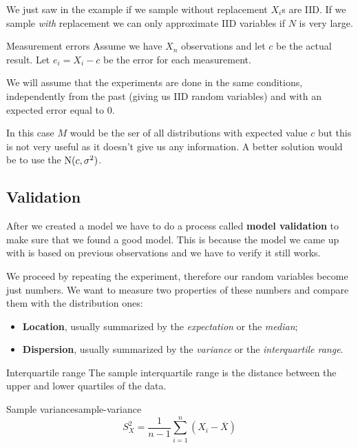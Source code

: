 \documentclass[12pt]{extarticle}
\newcommand{\Normal}{{\operatorfont N}}
\begin{document}
We just saw in the example if we sample without replacement $X_i$s are IID.
If we sample \textit{with} replacement we can only approximate IID variables if $N$ is very large.

\begin{example}{Measurement errors}{}
    Assume we have $X_n$ observations and let $c$ be the actual result.
    Let $e_i = X_i - c$ be the error for each measurement.

    We will assume that the experiments are done in the same conditions, independently from the past (giving us IID random variables) and with an expected error equal to $0$.

    In this case $M$ would be the ser of all distributions with expected value $c$ but this is not very useful as it doesn't give us any information.
    A better solution would be to use the $\Normal(c, \sigma^2)$.
\end{example}

\subsection{Validation}

After we created a model we have to do a process called \textbf{model validation} to make sure that we found a good model.
This is because the model we came up with is based on previous observations and we have to verify it still works.

We proceed by repeating the experiment, therefore our random variables become just numbers. We want to measure two properties of these numbers and compare them with the distribution ones:
\begin{itemize}
    \item \textbf{Location}, usually summarized by the \textit{expectation} or the \textit{median};
    \item \textbf{Dispersion}, usually summarized by the \textit{variance} or the \textit{interquartile range}.
\end{itemize}

\begin{remark}{Interquartile range}{}
    The sample interquartile range is the distance between the upper and lower quartiles of the data.
\end{remark}

\begin{definition}{Sample variance}{sample-variance}
    \begin{equation}
        S_X^2 = \frac{1}{n-1} \sum^n_{i = 1}(X_i - \overline X)
    \end{equation}
\end{definition}
\end{document}
